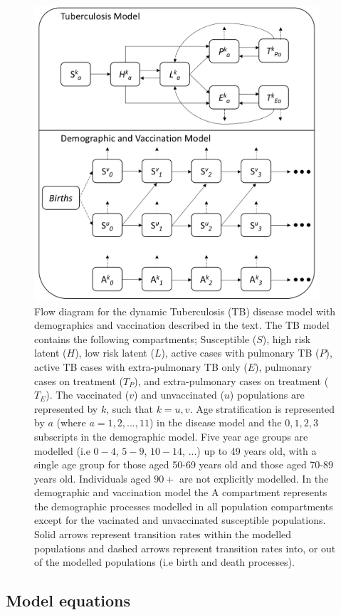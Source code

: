 \documentclass[11pt,twoside]{bristolthesis}
\begin{document}
  \begin{figure}
  
  {\centering \includegraphics[width=400px]{chapters/model-development/resources/model_diagrams/tb_model_flow} 
  
  }
  
  \caption{Flow diagram for the dynamic Tuberculosis (TB) disease model with demographics and vaccination described in the text. The TB model contains the following compartments; Susceptible ($S$), high risk latent ($H$), low risk latent ($L$), active cases with pulmonary TB ($P$), active TB cases with extra-pulmonary TB only ($E$), pulmonary cases on treatment ($T_P$), and extra-pulmonary cases on treatment ($T_E$). The vaccinated ($v$) and unvaccinated ($u$) populations are represented by $k$, such that $k = u,v$. Age stratification is represented by $a$ (where $a = 1, 2, ...,11$) in the disease model and the $0, 1, 2, 3$ subscripts in the demographic model. Five year age groups are modelled (i.e $0-4$, $5-9$, $10-14$, ...) up to 49 years old, with a single age group for those aged 50-69 years old and those aged 70-89 years old. Individuals aged $90+$ are not explicitly modelled. In the demographic and vaccination model the A compartment represents the demographic processes modelled in all population compartments except for the vacinated and unvaccinated susceptible populations. Solid arrows represent transition rates within the modelled populations and dashed arrows represent transition rates into, or out of the modelled populations (i.e birth and death processes).}\label{fig:model-flow-diag}
  \end{figure}
  \hypertarget{model-equations}{%
  \subsection{Model equations}\label{model-equations}}
  
\end{document}
